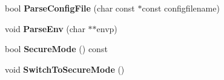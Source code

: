\begin{DoxyCompactItemize}
\item 
\hypertarget{classConfig_a0c8ebc50ad0d389f91fc27d31fe8e373}{bool {\bfseries Parse\-Config\-File} (char const $\ast$const configfilename)}\label{classConfig_a0c8ebc50ad0d389f91fc27d31fe8e373}

\item 
\hypertarget{classConfig_a14d2df1a5f41a8bbb85f8cceb0118b56}{void {\bfseries Parse\-Env} (char $\ast$$\ast$envp)}\label{classConfig_a14d2df1a5f41a8bbb85f8cceb0118b56}

\item 
\hypertarget{classConfig_a7a6e494acf2d756e931bd9cdd05da6f7}{bool {\bfseries Secure\-Mode} () const }\label{classConfig_a7a6e494acf2d756e931bd9cdd05da6f7}

\item 
\hypertarget{classConfig_adca6887755e8c1b169009845d11ca302}{void {\bfseries Switch\-To\-Secure\-Mode} ()}\label{classConfig_adca6887755e8c1b169009845d11ca302}

\end{DoxyCompactItemize}
